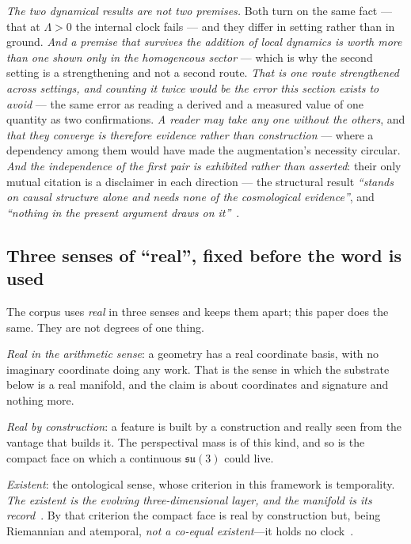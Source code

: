 \documentclass[11pt,a4paper]{article}
\theoremstyle{plain}
\theoremstyle{definition}
\begin{document}
\emph{The two dynamical results are not two premises.} Both turn on the same fact --- that at $\Lambda>0$ the
internal clock fails --- and they differ in setting rather than in ground. \emph{And a premise that survives
the addition of local dynamics is worth more than one shown only in the homogeneous sector} --- which is why
the second setting is a strengthening and not a second route. \emph{That is one route strengthened across settings, and counting it twice would be the
error this section exists to avoid} --- the same error as reading a derived and a measured value of one
quantity as two confirmations. \emph{A reader may take any one without
the others}, and \emph{that they converge is therefore evidence rather than construction} --- where a
dependency among them would have made the augmentation's necessity circular. \emph{And the independence of
the first pair is exhibited rather than asserted}: their only mutual citation is a disclaimer in each
direction --- the structural result \emph{``stands on causal structure alone and needs none of the
cosmological evidence''}, and \emph{``nothing in the present argument draws on
it''}~\cite{JanzenModernParallax,JanzenBHcausality}.

\subsection{Three senses of ``real'', fixed before the word is used}

The corpus uses \emph{real} in three senses and keeps them apart; this paper does the same. They are not
degrees of one thing.

\emph{Real in the arithmetic sense}: a geometry has a real coordinate basis, with no imaginary coordinate
doing any work. That is the sense in which the substrate below is a real manifold, and the claim is about
coordinates and signature and nothing more.

\emph{Real by construction}: a feature is built by a construction and really seen from the vantage that
builds it. The perspectival mass is of this kind, and so is the compact face on which a continuous
$\mathfrak{su}(3)$ could live.

\emph{Existent}: the ontological sense, whose criterion in this framework is temporality. \emph{The existent
is the evolving three-dimensional layer, and the manifold is its record}~\cite{JanzenCRframework}. By that
criterion the compact face is real by construction but, being Riemannian and atemporal, \emph{not a co-equal
existent}---it holds no clock~\cite{JanzenBoundary}.
\end{document}
